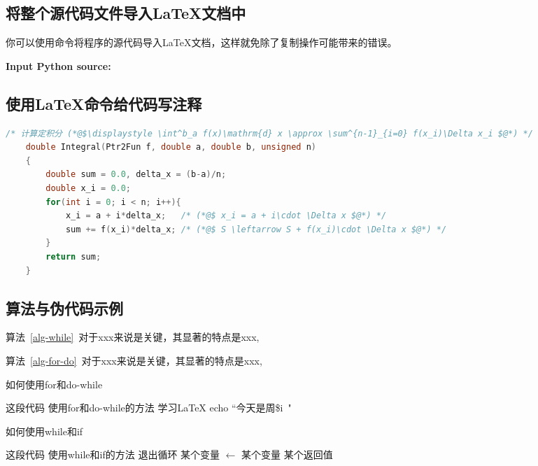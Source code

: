 \subsection{将整个源代码文件导入\LaTeX{}文档中}
你可以使用\lstinline||命令将程序的源代码导入\LaTeX 文档，这样就免除了复制操作可能带来的错误。

\textbf{\textcolor[rgb]{0.98,0,0}{Input Python source:}}


\subsection{使用{\LaTeX{}}命令给代码写注释}

\begin{lstlisting}[language=C,frame=shadowbox,title={Integral-2.c}]
    /* 计算定积分 (*@$\displaystyle \int^b_a f(x)\mathrm{d} x \approx \sum^{n-1}_{i=0} f(x_i)\Delta x_i $@*) */
	double Integral(Ptr2Fun f, double a, double b, unsigned n)
	{
		double sum = 0.0, delta_x = (b-a)/n; 
		double x_i = 0.0;
		for(int i = 0; i < n; i++){
			x_i = a + i*delta_x;   /* (*@$ x_i = a + i\cdot \Delta x $@*) */
			sum += f(x_i)*delta_x; /* (*@$ S \leftarrow S + f(x_i)\cdot \Delta x $@*) */
		}
		return sum; 				
	}
\end{lstlisting}


\subsection{算法与伪代码示例}

算法~\ref{alg-while}~对于xxx来说是关键，其显著的特点是xxx, 

算法~\ref{alg-for-do}~对于xxx来说是关键，其显著的特点是xxx, 

\begin{breakablealgorithm}
	\caption{如何使用for和do-while} \label{alg-for-do}
	\begin{algorithmic}[1]  %
		\Require 这段代码
		\Ensure 使用for和do-while的方法
		\Repeat
		\State 学习\LaTeX
		\State echo ``今天是周\$i\ "
		\EndFor
		\EndFunction
	\end{algorithmic}
\end{breakablealgorithm}

\begin{breakablealgorithm}
	\caption{如何使用while和if} \label{alg-while}
	\begin{algorithmic}[1]  %
		\Require 这段代码
		\Ensure 使用while和if的方法
		\State 退出循环
		\EndIf
		\State 某个变量  $\gets$ 某个变量
		\EndWhile
		\State\Return 某个返回值
		\EndFunction
	\end{algorithmic}
\end{breakablealgorithm}


